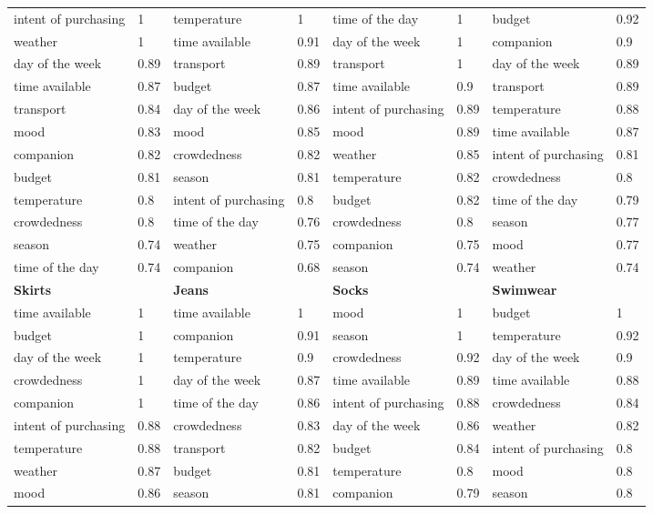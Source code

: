 \begin{center}
\begin{longtable}{p{2.2cm}p{0.5cm}p{2.2cm}p{0.5cm}p{2.2cm}p{0.5cm}p{2.3cm}p{0.5cm}}
\hline
intent of purchasing & 1 & temperature & 1 & time of the day & 1 & budget & 0.92 \\
weather & 1 & time available & 0.91 & day of the week & 1 & companion & 0.9 \\
day of the week & 0.89 & transport & 0.89 & transport & 1 & day of the week & 0.89 \\
time available & 0.87 & budget & 0.87 & time available & 0.9 & transport & 0.89 \\
transport & 0.84 & day of the week & 0.86 & intent of purchasing & 0.89 & temperature & 0.88 \\
mood & 0.83 & mood & 0.85 & mood & 0.89 & time available & 0.87 \\
companion & 0.82 & crowdedness & 0.82 & weather & 0.85 & intent of purchasing & 0.81 \\
budget & 0.81 & season & 0.81 & temperature & 0.82 & crowdedness & 0.8 \\
temperature & 0.8 & intent of purchasing & 0.8 & budget & 0.82 & time of the day & 0.79 \\
crowdedness & 0.8 & time of the day & 0.76 & crowdedness & 0.8 & season & 0.77 \\
season & 0.74 & weather & 0.75 & companion & 0.75 & mood & 0.77 \\
time of the day & 0.74 & companion & 0.68 & season & 0.74 & weather & 0.74 \\
\hline
\textbf{Skirts} &  & \textbf{Jeans} &  & \textbf{Socks} &  & \textbf{Swimwear} \\
\hline
time available & 1 & time available & 1 & mood & 1 & budget & 1 \\
budget & 1 & companion & 0.91 & season & 1 & temperature & 0.92 \\
day of the week & 1 & temperature & 0.9 & crowdedness & 0.92 & day of the week & 0.9 \\
crowdedness & 1 & day of the week & 0.87 & time available & 0.89 & time available & 0.88 \\
companion & 1 & time of the day & 0.86 & intent of purchasing & 0.88 & crowdedness & 0.84 \\
intent of purchasing & 0.88 & crowdedness & 0.83 & day of the week & 0.86 & weather & 0.82 \\
temperature & 0.88 & transport & 0.82 & budget & 0.84 & intent of purchasing & 0.8 \\
weather & 0.87 & budget & 0.81 & temperature & 0.8 & mood & 0.8 \\
mood & 0.86 & season & 0.81 & companion & 0.79 & season & 0.8 \\

\end{longtable}
\end{center}
